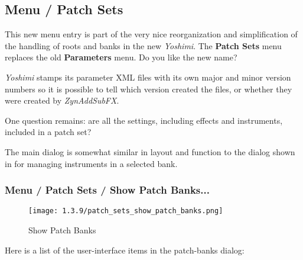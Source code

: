 %
%
%

\subsection{Menu / Patch Sets}
\label{subsubsec:menu_patch_sets}

   This new menu entry is part of the very nice reorganization and
   simplification of the handling of roots and banks in the new
   \textsl{Yoshimi}.  The \textbf{Patch Sets} menu replaces the old
   \textbf{Parameters} menu.  Do you like the new name?

   \textsl{Yoshimi} stamps its parameter XML files with its own major and
   minor version numbers so it is possible to tell which version created the
   files, or whether they were created by \textsl{ZynAddSubFX}.

   One question remains:  are all the settings, including effects and
   instruments, included in a patch set?

   The main dialog is somewhat similar in layout and function to the
   dialog shown in
   for managing instruments in a selected bank.

\subsubsection{Menu / Patch Sets / Show Patch Banks...}
\label{subsubsec:menu_patch_sets_show_patch_banks}

\begin{figure}[H]
   \centering 
   \texttt{[image: 1.3.9/patch\_sets\_show\_patch\_banks.png]}
   \caption[Show Patch Banks]{Show Patch Banks}
   \label{fig:show_patch_banks}
\end{figure}

   Here is a list of the user-interface items in the patch-banks dialog:


